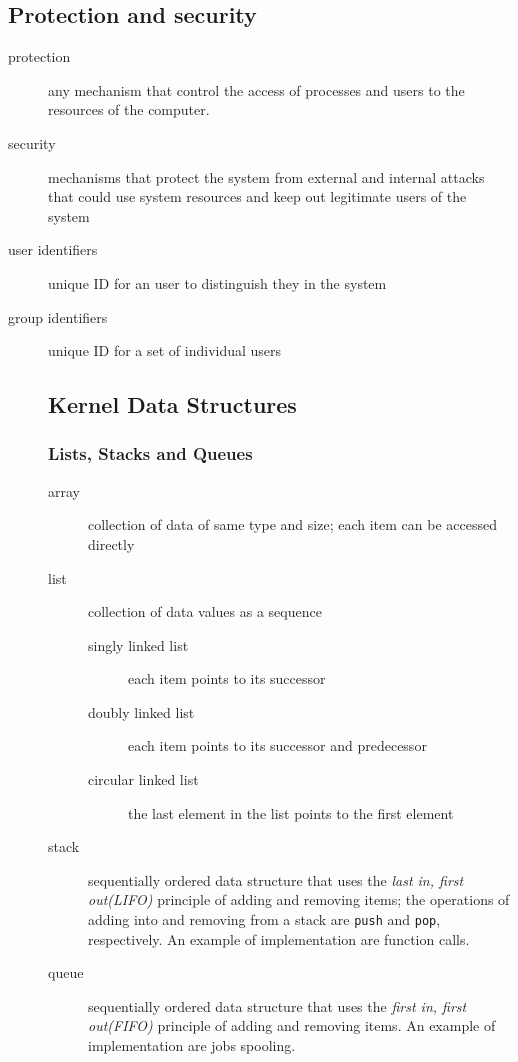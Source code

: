 \documentclass{article}
\begin{document}
\subsection{Protection and security}
\begin{description}
  \item[protection] any mechanism that control the access of processes and users to the resources of the computer.
  \item[security] mechanisms that protect the system from external and internal attacks that could use system resources and keep out legitimate users of the system
  \item[user identifiers] unique ID for an user to distinguish they in the system
  \item[group identifiers] unique ID for a set of individual users

\subsection{Kernel Data Structures}

\subsubsection{Lists, Stacks and Queues}
\begin{description}
  \item[array] collection of data of same type and size; each item can be accessed directly
  \item[list] collection of data values as a sequence
  \begin{description}
    \item[singly linked list] each item points to its successor
    \item[doubly linked list] each item points to its successor and predecessor
    \item[circular linked list] the last element in the list points to the first element
  \end{description}
  \item[stack] sequentially ordered data structure that uses the \emph{last in, first out(LIFO)} principle of adding and removing items; the operations of adding into and removing from a stack are \verb|push| and \verb|pop|, respectively. An example of implementation are function calls.
  \item[queue] sequentially ordered data structure that uses the \emph{first in, first out(FIFO)} principle of adding and removing items. An example of implementation are jobs spooling.
\end{description}


\end{description}
\end{document}
